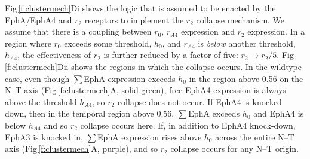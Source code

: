 \documentclass[9pt]{elife} %
\begin{document}
Fig\,\ref{f:clustermech}Di shows the logic that is assumed to be enacted by the EphA/EphA4 and $r_2$ receptors to implement the $r_2$ collapse mechanism. We assume that there is a coupling between $r_0$, $r_{A4}$ expression and $r_2$ expression. In a region where $r_0$ exceeds some threshold, $h_0$, and $r_{A4}$ is \emph{below} another threshold, $h_{A4}$, the effectiveness of $r_2$ is further reduced by a factor of five: $r_2 \rightarrow r_2/5$.
Fig\,\ref{f:clustermech}Dii shows the regions in which the collapse occurs.
In the wildtype case, even though $\sum$EphA expression exceeds $h_0$ in the region above 0.56 on the N--T axis (Fig\,\ref{f:clustermech}A, solid green), free EphA4 expression is always above the threshold $h_{A4}$, so $r_2$ collapse does not occur.
If EphA4 is knocked down, then in the temporal region above 0.56, $\sum$EphA exceeds $h_0$ and EphA4 is below $h_{A4}$ and so $r_2$ collapse occurs here.
If, in addition to EphA4 knock-down, EphA3 is knocked in, $\sum$EphA expression rises above $h_0$ across the entire N--T axis (Fig\,\ref{f:clustermech}A, purple), and so $r_2$ collapse occurs for any N--T origin.
\end{document}
